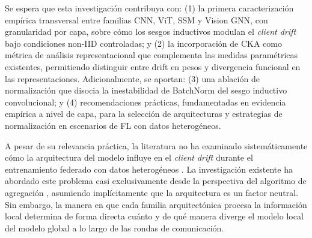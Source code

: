 Se espera que esta investigación contribuya con: (1) la primera caracterización empírica 
transversal entre familias CNN, ViT, SSM y Vision GNN, con granularidad por capa, sobre cómo 
los sesgos inductivos modulan el \textit{client drift} bajo condiciones non-IID controladas; y 
(2) la incorporación de CKA como métrica de análisis representacional que complementa las medidas 
paramétricas existentes, permitiendo distinguir entre drift en pesos y divergencia funcional en 
las representaciones. Adicionalmente, se aportan: (3) una ablación de normalización que disocia 
la inestabilidad de BatchNorm del sesgo inductivo convolucional; y (4) recomendaciones prácticas, 
fundamentadas en evidencia empírica a nivel de capa, para la selección de arquitecturas y 
estrategias de normalización en escenarios de FL con datos heterogéneos.



A pesar de su relevancia práctica, la literatura no ha examinado sistemáticamente 
cómo la arquitectura del modelo influye en el \textit{client drift} durante el entrenamiento 
federado con datos heterogéneos \cite{pieri2023handlingdataheterogeneityarchitectural, li2023fedtp}. 
La investigación existente ha abordado este problema casi exclusivamente desde la perspectiva 
del algoritmo de agregación \cite{siomos2024architecture}, asumiendo implícitamente que la 
arquitectura es un factor neutral. Sin embargo, la manera en que cada familia arquitectónica 
procesa la información local determina de forma directa cuánto y de qué manera diverge el 
modelo local del modelo global a lo largo de las rondas de comunicación.

